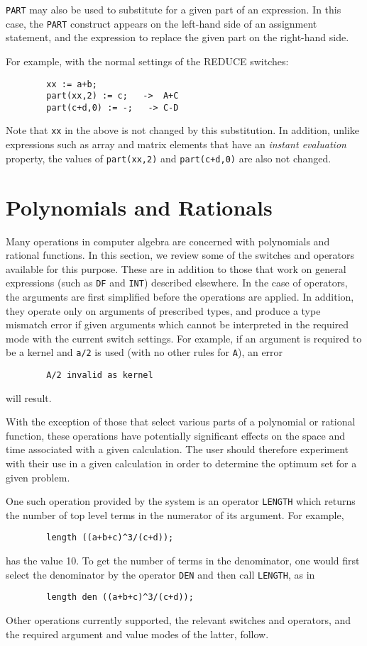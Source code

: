 \documentclass[11pt,letterpaper]{book}
\makeatletter
\newcommand{\REDUCE}{REDUCE}
\newcommand{\underscore}{\_}
\newcommand{\ttindex}[1]{{\renewcommand{\_}{\protect\underscore}%
                          \index{#1@{\tt #1}}}}
\makeatother
\begin{document}
{\tt PART} may also be used to substitute for a given part of an
expression.  In this case, the {\tt PART} construct appears on the
left-hand side of an assignment statement, and the expression to replace
the given part on the right-hand side.

For example, with the normal settings of the {\REDUCE} switches:
{\small\begin{verbatim}
        xx := a+b;
        part(xx,2) := c;   ->  A+C
        part(c+d,0) := -;   -> C-D
\end{verbatim}}

Note that {\tt xx} in the above is not changed by this substitution.  In
addition, unlike expressions such as array and matrix elements that have
an {\em instant evaluation\/} property, the values
of {\tt part(xx,2)} and {\tt part(c+d,0)} are also not changed.
\chapter{Polynomials and Rationals}

Many operations in computer algebra are concerned with polynomials
 and rational functions.  In
this section, we review some of the switches and operators available for
this purpose.  These are in addition to those that work on general
expressions (such as {\tt DF} and {\tt INT}) described elsewhere.  In the
case of operators, the arguments are first simplified before the
operations are applied.  In addition, they operate only on arguments of
prescribed types, and produce a type mismatch error if given arguments
which cannot be interpreted in the required mode with the current switch
settings.  For example, if an argument is required to be a kernel and
{\tt a/2} is used (with no other rules for {\tt A}), an error
{\small\begin{verbatim}
        A/2 invalid as kernel
\end{verbatim}}
will result.

With the exception of those that select various parts of a polynomial or
rational function, these operations have potentially significant effects on
the space and time associated with a given calculation. The user should
therefore experiment with their use in a given calculation in order to
determine the optimum set for a given problem.

One such operation provided by the system is an operator {\tt LENGTH}
\ttindex{LENGTH} which returns the number of top level terms in the
numerator of its argument.  For example,
{\small\begin{verbatim}
        length ((a+b+c)^3/(c+d));
\end{verbatim}}
has the value 10.  To get the number of terms in the denominator, one
would first select the denominator by the operator {\tt DEN}\ttindex{DEN}
and then call {\tt LENGTH}, as in
{\small\begin{verbatim}
        length den ((a+b+c)^3/(c+d));
\end{verbatim}}
Other operations currently supported, the relevant switches and operators,
and the required argument and value modes of the latter, follow.
\end{document}
